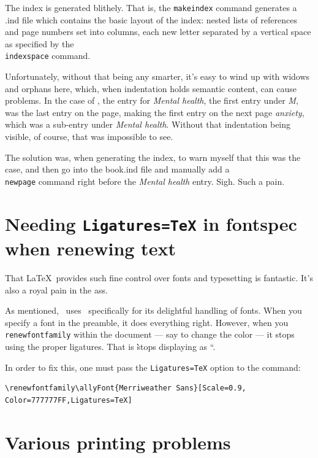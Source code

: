 \begin{paracol}{2}
\begin{leftcolumn}
The index is generated blithely. That is, the \texttt{makeindex} command generates a .ind file which contains the basic layout of the index: nested lists of references and page numbers set into columns, each new letter separated by a vertical space as specified by the \texttt{\\indexspace} command.

Unfortunately, without that being any smarter, it's easy to wind up with widows and orphans here, which, when indentation holds semantic content, can cause problems. In the case of \allyWord, the entry for \emph{Mental health}, the first entry under \emph{M}, was the last entry on the page, making the first entry on the next page \emph{anxiety}, which was a sub-entry under \emph{Mental health}. Without that indentation being visible, of course, that was impossible to see.

The solution was, when generating the index, to warn myself that this was the case, and then go into the book.ind file and manually add a \texttt{\\newpage} command right before the \emph{Mental health} entry. Sigh. Such a pain.

\section*{Needing \texttt{Ligatures=TeX} in fontspec when renewing text}\label{ligatures}

That \LaTeX\ provides such fine control over fonts and typesetting is fantastic. It's also a royal pain in the ass.

As mentioned, \allyWord\ uses \XeLaTeX\ specifically for its delightful handling of fonts. When you specify a font in the preamble, it does everything right. However, when you \texttt{\\renewfontfamily} within the document --- say to change the color --- it stops using the proper ligatures. That is \`\` stops displaying as ``.

In order to fix this, one must pass the \texttt{Ligatures=TeX} option to the command:

\begin{verbatim}
\renewfontfamily\allyFont{Merriweather Sans}[Scale=0.9,
Color=777777FF,Ligatures=TeX]
\end{verbatim}

\section*{Various printing problems}\label{printing}


\end{leftcolumn}
\end{paracol}
